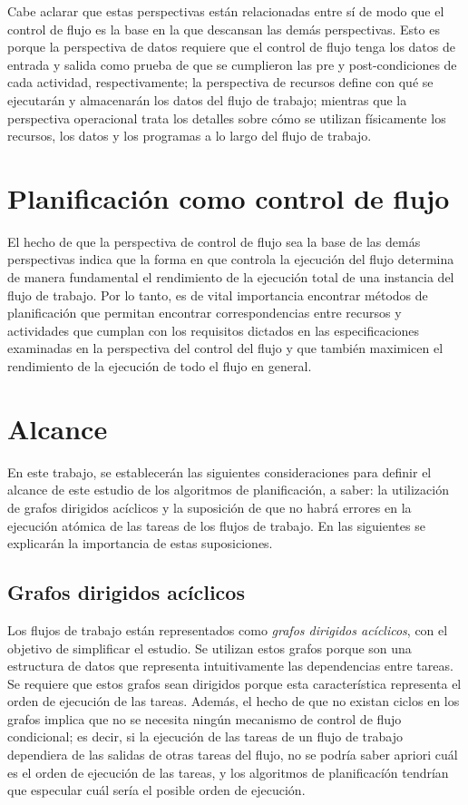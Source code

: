 Cabe aclarar que estas perspectivas están relacionadas entre sí de modo que el control de flujo es la base en la que descansan las demás perspectivas. Esto es porque la perspectiva de datos requiere que el control de flujo tenga los datos de entrada y salida como prueba de que se cumplieron las pre y post-condiciones de cada actividad, respectivamente; la perspectiva de recursos define con qué se ejecutarán y almacenarán los datos del flujo de trabajo; mientras que la perspectiva operacional trata los detalles sobre cómo se utilizan físicamente los recursos, los datos y los programas a lo largo del flujo de trabajo.


\section{Planificación como control de flujo}

El hecho de que la perspectiva de control de flujo sea la base de las demás perspectivas indica que la forma en que controla la ejecución del flujo determina de manera fundamental el rendimiento de la ejecución total de una instancia del flujo de trabajo. Por lo tanto, es de vital importancia encontrar métodos de planificación que permitan encontrar correspondencias entre recursos y actividades que cumplan con los requisitos dictados en las especificaciones examinadas en la perspectiva del control del flujo y que también maximicen el rendimiento de la ejecución de todo el flujo en general.

\section{Alcance}

En este trabajo, se establecerán las siguientes consideraciones para definir el alcance de este estudio de los algoritmos de planificación, a saber: la utilización de grafos dirigidos acíclicos y la suposición de que no habrá errores en la ejecución atómica de las tareas de los flujos de trabajo. En las siguientes se explicarán la importancia de estas suposiciones.

\subsection{Grafos dirigidos acíclicos}
Los flujos de trabajo están representados como \emph{grafos dirigidos acíclicos}, con el objetivo de simplificar el estudio. Se utilizan estos grafos porque son una estructura de datos que representa intuitivamente las dependencias entre tareas. Se requiere que estos grafos sean dirigidos porque esta característica representa el orden de ejecución de las tareas. Además, el hecho de que no existan ciclos en los grafos implica que no se necesita ningún mecanismo de control de flujo condicional; es decir, si la ejecución de las tareas de un flujo de trabajo dependiera de las salidas de otras tareas del flujo, no se podría saber apriori cuál es el orden de ejecución de las tareas, y los algoritmos de planificacíón tendrían que especular cuál sería el posible orden de ejecución.

